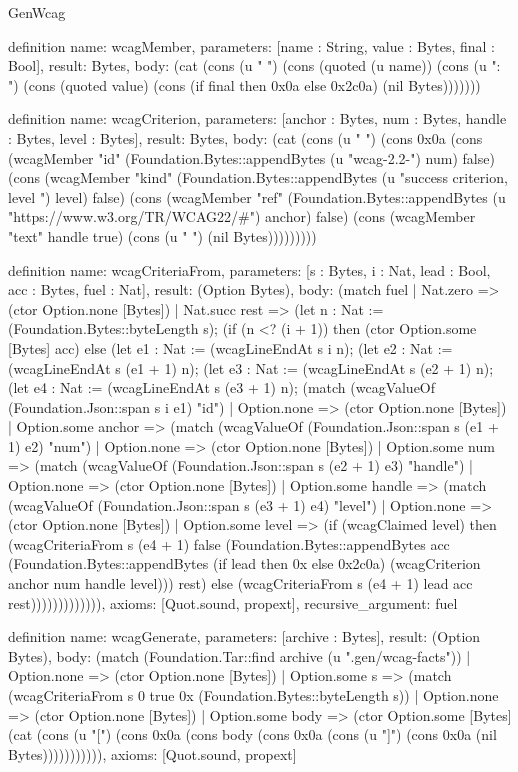 \begin{lexlean}{GenWcag}
\begin{semanticmodule}
definition{
  name: wcagMember,
  parameters: [name : String, value : Bytes, final : Bool],
  result: Bytes,
  body: (cat (cons (u "  ") (cons (quoted (u name)) (cons (u ": ") (cons (quoted value) (cons (if final then 0x0a else 0x2c0a) (nil Bytes)))))))
}

definition{
  name: wcagCriterion,
  parameters: [anchor : Bytes, num : Bytes, handle : Bytes, level : Bytes],
  result: Bytes,
  body: (cat (cons (u " {") (cons 0x0a (cons (wcagMember "id" (Foundation.Bytes::appendBytes (u "wcag-2.2-") num) false) (cons (wcagMember "kind" (Foundation.Bytes::appendBytes (u "success criterion, level ") level) false) (cons (wcagMember "ref" (Foundation.Bytes::appendBytes (u "https://www.w3.org/TR/WCAG22/#") anchor) false) (cons (wcagMember "text" handle true) (cons (u " }") (nil Bytes)))))))))
}

definition{
  name: wcagCriteriaFrom,
  parameters: [s : Bytes, i : Nat, lead : Bool, acc : Bytes, fuel : Nat],
  result: (Option Bytes),
  body: (match fuel
    | Nat.zero => (ctor Option.none [Bytes])
    | Nat.succ rest => (let n : Nat := (Foundation.Bytes::byteLength s); (if (n <? (i + 1)) then (ctor Option.some [Bytes] acc) else (let e1 : Nat := (wcagLineEndAt s i n); (let e2 : Nat := (wcagLineEndAt s (e1 + 1) n); (let e3 : Nat := (wcagLineEndAt s (e2 + 1) n); (let e4 : Nat := (wcagLineEndAt s (e3 + 1) n); (match (wcagValueOf (Foundation.Json::span s i e1) "id")
      | Option.none => (ctor Option.none [Bytes])
      | Option.some anchor => (match (wcagValueOf (Foundation.Json::span s (e1 + 1) e2) "num")
        | Option.none => (ctor Option.none [Bytes])
        | Option.some num => (match (wcagValueOf (Foundation.Json::span s (e2 + 1) e3) "handle")
          | Option.none => (ctor Option.none [Bytes])
          | Option.some handle => (match (wcagValueOf (Foundation.Json::span s (e3 + 1) e4) "level")
            | Option.none => (ctor Option.none [Bytes])
            | Option.some level => (if (wcagClaimed level) then (wcagCriteriaFrom s (e4 + 1) false (Foundation.Bytes::appendBytes acc (Foundation.Bytes::appendBytes (if lead then 0x else 0x2c0a) (wcagCriterion anchor num handle level))) rest) else (wcagCriteriaFrom s (e4 + 1) lead acc rest))))))))))))),
  axioms: [Quot.sound, propext],
  recursive_argument: fuel
}

definition{
  name: wcagGenerate,
  parameters: [archive : Bytes],
  result: (Option Bytes),
  body: (match (Foundation.Tar::find archive (u ".gen/wcag-facts"))
    | Option.none => (ctor Option.none [Bytes])
    | Option.some s => (match (wcagCriteriaFrom s 0 true 0x (Foundation.Bytes::byteLength s))
      | Option.none => (ctor Option.none [Bytes])
      | Option.some body => (ctor Option.some [Bytes] (cat (cons (u "[") (cons 0x0a (cons body (cons 0x0a (cons (u "]") (cons 0x0a (nil Bytes))))))))))),
  axioms: [Quot.sound, propext]
}
\end{semanticmodule}
\end{lexlean}
